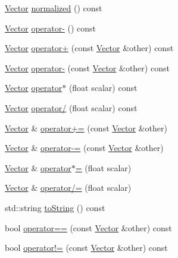 \begin{DoxyCompactItemize}
\item 
\hyperlink{struct_leap_1_1_vector}{Vector} \hyperlink{struct_leap_1_1_vector_a1e53e5841c03042cd1d19e360254a309}{normalized} () const
\item 
\hyperlink{struct_leap_1_1_vector}{Vector} \hyperlink{struct_leap_1_1_vector_a5c3d49e360bbef5ce6e2766e17b4a03b}{operator-\/} () const
\item 
\hyperlink{struct_leap_1_1_vector}{Vector} \hyperlink{struct_leap_1_1_vector_a1d8bf3a008f4fa65c31ab63eaca825c7}{operator+} (const \hyperlink{struct_leap_1_1_vector}{Vector} \&other) const
\item 
\hyperlink{struct_leap_1_1_vector}{Vector} \hyperlink{struct_leap_1_1_vector_a6304f66244a3deb215af604a5fb9a782}{operator-\/} (const \hyperlink{struct_leap_1_1_vector}{Vector} \&other) const
\item 
\hyperlink{struct_leap_1_1_vector}{Vector} \hyperlink{struct_leap_1_1_vector_a3d9fcce0dd22cfe643c18bb97d16b613}{operator$\ast$} (float scalar) const
\item 
\hyperlink{struct_leap_1_1_vector}{Vector} \hyperlink{struct_leap_1_1_vector_ac5cac29894a104d7e5b46a10d19f423e}{operator/} (float scalar) const
\item 
\hyperlink{struct_leap_1_1_vector}{Vector} \& \hyperlink{struct_leap_1_1_vector_ac2dbd10e09399bc5679ceee380cff2cc}{operator+=} (const \hyperlink{struct_leap_1_1_vector}{Vector} \&other)
\item 
\hyperlink{struct_leap_1_1_vector}{Vector} \& \hyperlink{struct_leap_1_1_vector_a71f56cf12c752f001d44c6a9ed3c15db}{operator-\/=} (const \hyperlink{struct_leap_1_1_vector}{Vector} \&other)
\item 
\hyperlink{struct_leap_1_1_vector}{Vector} \& \hyperlink{struct_leap_1_1_vector_a3c07a9eb80762ca448a78650500f06a8}{operator$\ast$=} (float scalar)
\item 
\hyperlink{struct_leap_1_1_vector}{Vector} \& \hyperlink{struct_leap_1_1_vector_a0c83e9d07018bdb3b3404088939a050d}{operator/=} (float scalar)
\item 
std\+::string \hyperlink{struct_leap_1_1_vector_a39a0f655940e0e45f97ea1856f630629}{to\+String} () const
\item 
bool \hyperlink{struct_leap_1_1_vector_af169611d1e4c49140af6dac3e780c799}{operator==} (const \hyperlink{struct_leap_1_1_vector}{Vector} \&other) const
\item 
bool \hyperlink{struct_leap_1_1_vector_a749e4340ca64ff3549f4d84eb398ac4f}{operator!=} (const \hyperlink{struct_leap_1_1_vector}{Vector} \&other) const

\end{DoxyCompactItemize}
